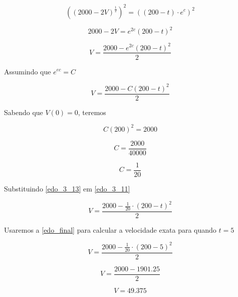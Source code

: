 \documentclass[11pt]{article}
\begin{document}
\begin{equation*}
    \label{edo_3_9}
    ((2000 - 2V)^{\frac{1}{2}})^{2} = ((200 - t) \cdot e^{c})^{2}
\end{equation*}

\begin{equation*}
    \label{edo_3_10}
    2000 - 2V = e^{2c}(200 - t)^{2}
\end{equation*}

\begin{equation*}
    V = \frac{2000 - e^{2c}(200 - t)^{2}}{2}
\end{equation*}

Assumindo que \(e^{ec} = C\)

\begin{equation}
    \label{edo_3_11}
    V = \frac{2000 - C(200 - t)^{2}}{2}
\end{equation}

Sabendo que \(V(0) = 0\), teremos

\begin{equation*}
    \label{edo_3_12}
    C(200)^{2} = 2000
\end{equation*}

\begin{equation*}
    C = \frac{2000}{40000}
\end{equation*}

\begin{equation}
    \label{edo_3_13}
    C = \frac{1}{20}
\end{equation}

Substituindo \eqref{edo_3_13} em \eqref{edo_3_11}

\begin{equation}
    \label{edo_final}
    V = \frac{2000 - \frac{1}{20} \cdot (200 - t)^{2}}{2}
\end{equation}

Usaremos a \eqref{edo_final} para calcular a velocidade exata para
quando \(t = 5\)

\begin{equation*}
    \label{edo_solucao_1}
    V = \frac{2000 - \frac{1}{20} \cdot(200 - 5)^{2}}{2}
\end{equation*}

\begin{equation*}
    \label{edo_solucao_2}
    V = \frac{2000 - 1901.25}{2}
\end{equation*}

\begin{equation}
    \label{edo_solucao_final}
    V = 49.375
\end{equation}


    
    
    
    
\end{document}

